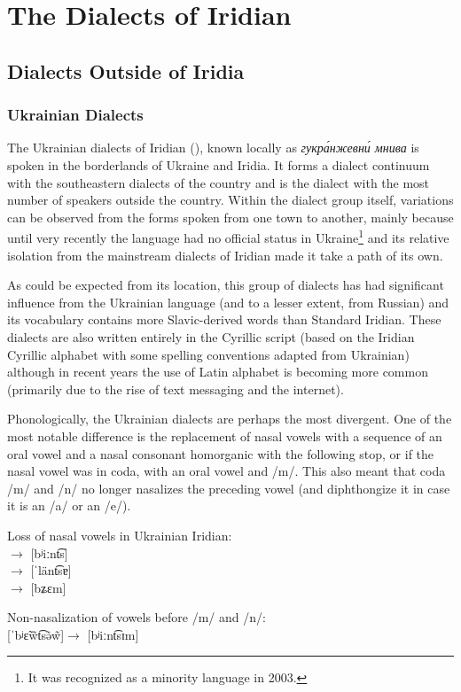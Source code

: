 \chapter{The Dialects of Iridian}


\section{Dialects Outside of Iridia}

\subsection{Ukrainian Dialects}

The Ukrainian dialects of Iridian (), known locally as \textit{гу\-кр\'ан\-же\-вн\'и мни\-ва} is spoken in the borderlands of Ukraine and Iridia. It forms a dialect continuum with the southeastern dialects of the country and is the dialect with the most number of speakers outside the country. Within the dialect group itself, variations can be observed from the forms spoken from one town to another, mainly because until very recently the language had no official status in Ukraine\footnote{It was recognized as a minority language in 2003.} and its relative isolation from the mainstream dialects of Iridian made it take a path of its own.

As could be expected from its location, this group of dialects has had significant influence from the Ukrainian language (and to a lesser extent, from Russian) and its vocabulary contains more Slavic-derived words than Standard Iridian. These dialects are also written entirely in the Cyrillic script (based on the Iridian Cyrillic alphabet with some spelling conventions adapted from Ukrainian) although in recent years the use of Latin alphabet is becoming more common (primarily due to the rise of text messaging and the internet).

Phonologically, the Ukrainian dialects are perhaps the most divergent. One of the most notable difference is the replacement of nasal vowels with a sequence of an oral vowel and a nasal consonant homorganic with the following stop, or if the nasal vowel was in coda, with an oral vowel and /m/. This also meant that coda /m/ and /n/ no longer nasalizes the preceding vowel (and diphthongize it in case it is an /a/ or an /e/).

\ex
Loss of nasal vowels in Ukrainian Iridian:\\
\quad$\rightarrow$\quad{} [bʲiːnt͡s]\\
\quad$\rightarrow$\quad{} [ˈlänt͡sɐ]\\
\quad$\rightarrow$\quad{} [bʑɛm]
\xe

\ex
Non-nasalization of vowels before /m/ and /n/:\\
[ˈbʲɛ̃w̃t͡sə̃w̃]\quad$\rightarrow$\quad{} [bʲiːnt͡sɪm]\\

\xe
